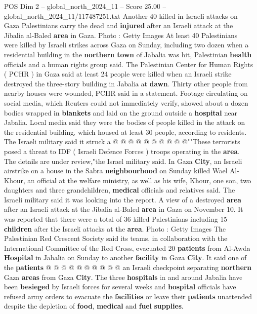 \begin{textsample}{POS Dim 2 – global\_north\_2024\_11 – Score 25.00 – global\_north\_2024\_11/117487251.txt}  \label{ex:f2_pos_360}
Another 40 killed in Israeli attacks on Gaza Palestinians carry the dead and \textbf{injured} after an Israeli attack at the Jibalia al-Baled \textbf{area} in Gaza.
Photo : Getty Images At least 40 Palestinians were killed by Israeli strikes across Gaza on Sunday, including two dozen when a residential building in the \textbf{northern} \textbf{town} of Jabalia was hit, Palestinian \textbf{health} officials and a human rights group said.
The Palestinian Center for Human Rights ( PCHR ) in Gaza said at least 24 people were killed when an Israeli strike destroyed the three-story building in Jabalia at \textbf{dawn}.
Thirty other people from nearby houses were wounded, PCHR said in a statement.
Footage circulating on social media, which Reuters could not immediately verify, showed about a dozen bodies wrapped in \textbf{blankets} and laid on the ground outside a \textbf{hospital} near Jabalia.
Local media said they were the bodies of people killed in the attack on the residential building, which housed at least 30 people, according to residents.
The Israeli military said it struck a @ @ @ @ @ @ @ @ @ @""These terrorists posed a threat to IDF ( Israeli Defence Forces ) troops operating in the \textbf{area}.
The details are under review,"the Israel military said.
In Gaza \textbf{City}, an Israeli airstrike on a house in the Sabra \textbf{neighbourhood} on Sunday killed Wael Al-Khour, an official at the welfare ministry, as well as his wife, Khour, one son, two daughters and three grandchildren, \textbf{medical} officials and relatives said.
The Israeli military said it was looking into the report.
A view of a destroyed \textbf{area} after an Israeli attack at the Jibalia al-Baled \textbf{area} in Gaza on November 10.
It was reported that there were a total of 36 killed Palestinians including 15 \textbf{children} after the Israeli attacks at the \textbf{area}.
Photo : Getty Images The Palestinian Red Crescent Society said its teams, in collaboration with the International Committee of the Red Cross, evacuated 20 \textbf{patients} from Al-Awda \textbf{Hospital} in Jabalia on Sunday to another \textbf{facility} in Gaza \textbf{City}.
It said one of the \textbf{patients} @ @ @ @ @ @ @ @ @ @ an Israeli checkpoint separating \textbf{northern} Gaza \textbf{areas} from Gaza \textbf{City}.
The three \textbf{hospitals} in and around Jabalia have been \textbf{besieged} by Israeli forces for several weeks and \textbf{hospital} officials have refused army orders to evacuate the \textbf{facilities} or leave their \textbf{patients} unattended despite the depletion of \textbf{food}, \textbf{medical} and \textbf{fuel} \textbf{supplies}.

\end{textsample}
